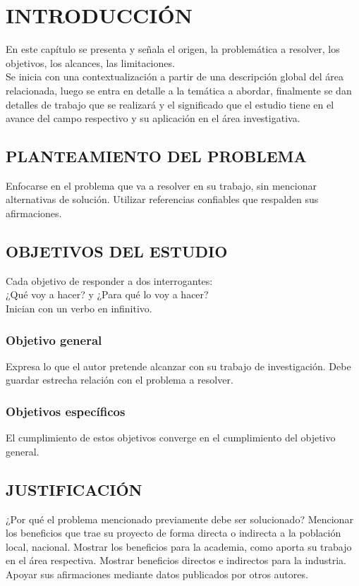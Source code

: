 \section*{INTRODUCCIÓN}
En este capítulo se presenta y señala el origen, la problemática a resolver, los objetivos, los alcances, las limitaciones.\\

Se inicia con una contextualización a partir de una descripción global del área relacionada, luego se entra en detalle a la temática a abordar, finalmente se dan detalles de trabajo que se realizará y el significado que el estudio tiene en el avance del campo respectivo y su aplicación en el área investigativa.
\subsection*{\hspace{5mm}PLANTEAMIENTO DEL PROBLEMA}
Enfocarse en el problema que va a resolver en su trabajo, sin mencionar alternativas de solución. Utilizar referencias confiables que respalden sus afirmaciones.
\subsection*{\hspace{5mm}OBJETIVOS DEL ESTUDIO}
Cada objetivo de responder a dos interrogantes:\\
¿Qué voy a hacer? y ¿Para qué lo voy a hacer?\\
Inician con un verbo en infinitivo.
\subsubsection*{\hspace{5mm}Objetivo general}
Expresa lo que el autor pretende alcanzar con su trabajo de investigación. Debe guardar estrecha relación con el problema a resolver.
\subsubsection*{\hspace{5mm}Objetivos específicos}
El cumplimiento de estos objetivos converge en el cumplimiento del objetivo general.
\subsection*{\hspace{5mm}JUSTIFICACIÓN}
¿Por qué el problema mencionado previamente debe ser solucionado? Mencionar los beneficios que trae su proyecto de forma directa o indirecta a la población local, nacional. Mostrar los beneficios para la academia, como aporta su trabajo en el área respectiva. Mostrar beneficios directos e indirectos para la industria. Apoyar sus afirmaciones mediante datos publicados por otros autores.
